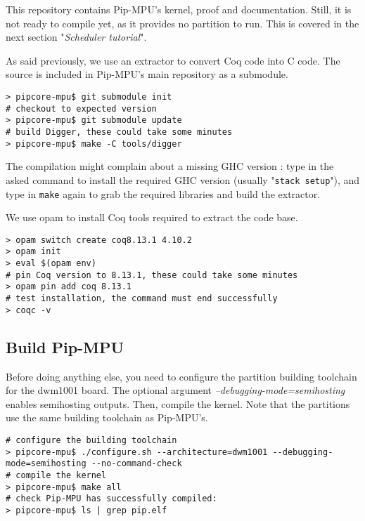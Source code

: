 \documentclass[10pt,a4paper,titlepage]{refart}
\begin{document}
This repository contains Pip-MPU's kernel, proof and documentation. Still,
it is not ready to compile yet, as it provides no partition to run.
This is covered in the next section "\textit{Scheduler tutorial}".

As said previously, we use an extractor to convert Coq code into C code.
The source is included in Pip-MPU's main repository as a submodule.
\begin{lstlisting}[style=BashStyle]
> pipcore-mpu$ git submodule init
# checkout to expected version
> pipcore-mpu$ git submodule update
# build Digger, these could take some minutes
> pipcore-mpu$ make -C tools/digger
\end{lstlisting}
The compilation might complain about a missing GHC version : type in the asked command to install the required GHC version (usually "\texttt{stack setup}"), and type in \texttt{make} again to grab the required libraries and build the extractor.

We use opam to install Coq tools required to extract the code base.

\begin{lstlisting}[style=BashStyle]
> opam switch create coq8.13.1 4.10.2
> opam init
> eval $(opam env)
# pin Coq version to 8.13.1, these could take some minutes
> opam pin add coq 8.13.1
# test installation, the command must end successfully
> coqc -v
\end{lstlisting}

\subsection{Build Pip-MPU} \label{buildpip}
Before doing anything else, you need to configure the partition building toolchain for the dwm1001 board.
The optional argument \textit{--debugging-mode=semihosting} enables semihosting outputs.
Then, compile the kernel.
Note that the partitions use the same building toolchain as Pip-MPU's.

\begin{lstlisting}[style=BashStyle]
# configure the building toolchain
> pipcore-mpu$ ./configure.sh --architecture=dwm1001 --debugging-mode=semihosting --no-command-check
# compile the kernel
> pipcore-mpu$ make all
# check Pip-MPU has successfully compiled:
> pipcore-mpu$ ls | grep pip.elf
\end{lstlisting}
\end{document}
